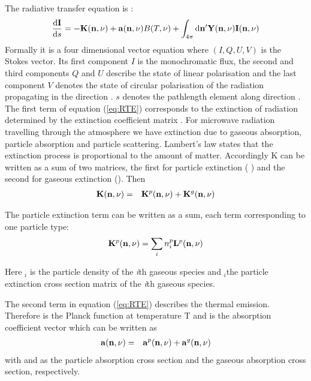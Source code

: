 The radiative transfer equation is \citep{mishchenko00:_light_scatt_nonsp_partic}: 
\begin{eqnarray}
     \frac{\mathrm{d} {\bf I}}{\mathrm{d} s} =
     -{\bf K}({\bf n}, \nu)+{\bf a}({\bf n}, \nu) B(T, \nu)
     +\int_{4\pi} \mathrm{d} {\bf n}' {\bf Y}({\bf n}, \nu) {\bf I}({\bf n}, \nu) 
     \label{eq:RTE} 
\end{eqnarray} 
Formally it is a four dimensional vector equation where \StoVec
$(I,Q,U,V)$ is the Stokes vector.
Its first component $I$ is the monochromatic flux, the
second and third components $Q$ and $U$ describe the state of linear
polarisation and the last component $V$ denotes the state of circular
polarisation of the radiation propagating in the direction \PDir.
\DiffD $s$ denotes the pathlength element along direction \PDir.
\\

The first term of equation (\ref{eq:RTE}) corresponds to the extinction of
radiation determined by the extinction coefficient matrix \ExtMat
. For microwave radiation travelling through the atmosphere we
have extinction due to gaseous
absorption, particle absorption and  particle scattering. Lambert's law
states that the extinction process is
proportional to the amount of matter. Accordingly K can be written as
a sum of two matrices, the first for particle extinction ( )
and the second for gaseous extinction (). Then
\begin{eqnarray}
  {\bf K}({\bf n}, \nu) &=&
  {\bf K}^{p}({\bf n}, \nu)+{\bf K}^{g}({\bf n}, \nu)
\end{eqnarray}

The particle extinction term can be written as a sum, each term
corresponding to one particle type:
\begin{eqnarray}
  {\bf K}^{p}({\bf n}, \nu) = \sum_i n^p_i {\bf L}^{p} ({\bf n}, \nu)
\end{eqnarray}

Here \PDen$_i$ is the particle density of the
{\sl i}th gaseous species and  $_i$\DirFre  the particle
extinction cross section matrix of the
{\sl i}th gaseous species.

The second term in equation (\ref{eq:RTE})  describes the thermal
emission. Therefore \Planck  is the Planck
function at temperature T and \AbsVec  is the absorption
coefficient vector which can be written as
 \begin{eqnarray}
  {\bf a} ({\bf n}, \nu)  &=& {\bf a}^{p} ({\bf n}, \nu) + {\bf a}^{g} ({\bf n}, \nu) 
  \end{eqnarray}
with  and  as the particle
absorption 
cross section
and the gaseous absorption cross section, respectively. 

